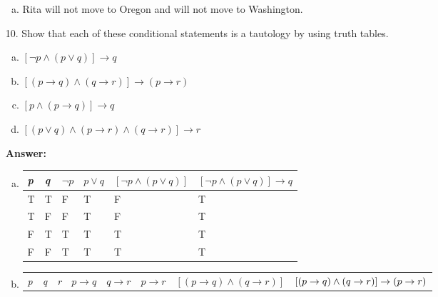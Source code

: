 \begin{itemize}
\begin{enumerate}[a.]
              \item Rita will not move to Oregon and will not move to Washington.
          \end{enumerate}
    \item[10.]Show that each of these conditional statements is a tautology by using truth tables.
          \begin{enumerate}[a.]
              \item $[\neg p \land (p \lor q)] \to q$
              \item $[(p \to q) \land (q \to r)] \to (p \to r)$
              \item $[p \land (p \to q)] \to q$
              \item $[(p \lor q) \land (p \to r) \land (q \to r)] \to r$
          \end{enumerate}
          \textbf{Answer:}
          \begin{enumerate}[a.]
              \item
                    \begin{tabular}{|l|l|l|l|l|l|}
                        \hline
                        \textit{p} & \textit{q} & $\neg p$ & $p \lor q$ & $[\neg p \land (p \lor q)]$ & $[\neg p \land (p \lor q)] \to q$ \\
                        \hline
                        T          & T          & F        & T          & F                           & T                                 \\
                        \hline
                        T          & F          & F        & T          & F                           & T                                 \\
                        \hline
                        F          & T          & T        & T          & T                           & T                                 \\
                        \hline
                        F          & F          & T        & T          & T                           & T                                 \\
                        \hline
                    \end{tabular}
              \item
                    \begin{tabular}{|l|l|l|l|l|l|l|p{3cm}|}
                        \hline
                        \textit{p} & \textit{q} & \textit{r} & $p \to q$ & $q \to r$ & $p \to r$ & $[(p \to q) \land (q \to r)]$ & $[(p \to q) \land (q \to r)] \newline \to (p \to r)$ \\

\end{tabular}
\end{enumerate}
\end{itemize}
